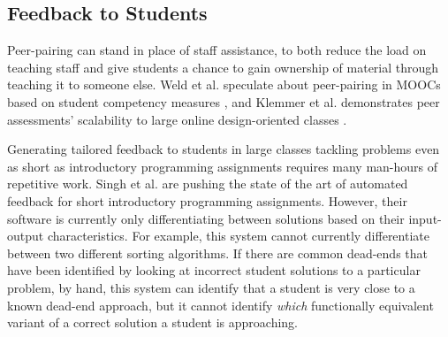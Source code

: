 \documentclass[12pt]{article}
\begin{document}
%
%
%


\subsection{Feedback to Students}

Peer-pairing can stand in place of staff assistance, to both reduce the load on teaching staff and give students a chance to gain ownership of material through teaching it to someone else. Weld et al. speculate about peer-pairing in MOOCs based on student competency measures \cite{WeldHcomp12}, and Klemmer et al. demonstrates peer assessments' scalability to large online design-oriented classes \cite{Klemmer}.

Generating tailored feedback to students in large classes tackling problems even as short as introductory programming assignments requires many man-hours of repetitive work. Singh et al. \cite{rishabh} are pushing the state of the art of automated feedback for short introductory programming assignments. However, their software is currently only differentiating between solutions based on their input-output characteristics. For example, this system cannot currently differentiate between two different sorting algorithms. If there are common dead-ends that have been identified by looking at incorrect student solutions to a particular problem, by hand, this system can identify that a student is very close to a known dead-end approach, but it cannot identify {\em which} functionally equivalent variant of a correct solution a student is approaching. 
\end{document}
